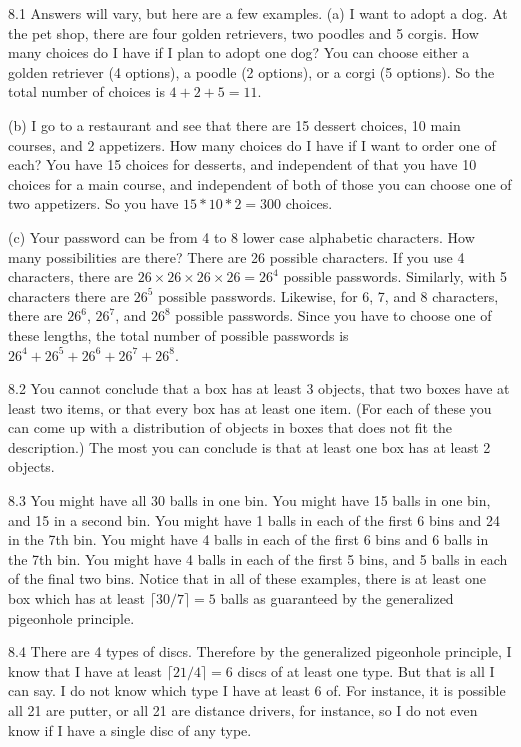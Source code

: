 \begin{RequAnswer}{8.1}
Answers will vary, but here are a few examples.
(a) I want to adopt a dog. At the pet shop, there are four golden retrievers, two poodles and 5 corgis.
How many choices do I have if I plan to adopt one dog?
You can choose either a golden retriever (4 options), a poodle (2 options), or a corgi (5 options).
So the total number of choices is $4 + 2 + 5 = 11$.

(b) I go to a restaurant and see that there are 15 dessert choices,
10 main courses, and 2 appetizers. How many choices do I have if I want to order one of each?
You have 15 choices for desserts, and independent of that you have 10 choices for a main course,
and independent of both of those you can choose one of two appetizers.
So you have $15 * 10 * 2 = 300$ choices.

(c) Your password can be from 4 to 8 lower case alphabetic characters. How many possibilities are there?
There are 26 possible characters. If you use 4 characters, there are
$26\times 26\times 26\times 26 = 26^4$ possible passwords.
Similarly, with 5 characters there are $26^5$ possible passwords.
Likewise, for 6, 7, and 8 characters, there are $26^6$, $26^7$, and $26^8$ possible passwords.
Since you have to choose one of these lengths, the total number of possible passwords is
$26^4+26^5+26^6+26^7+26^8$.
\end{RequAnswer}
\begin{RequAnswer}{8.2}
You cannot conclude that a box has at least 3 objects, that two boxes have at least two items,
or that every box has at least one item.
(For each of these you can come up with a distribution of objects in boxes that does not fit the description.)
The most you can conclude is that at least one box has at least 2 objects.
\end{RequAnswer}
\begin{RequAnswer}{8.3}
You might have all 30 balls in one bin.
You might have 15 balls in one bin, and 15 in a second bin.
You might have 1 balls in each of the first 6 bins and 24 in the 7th bin.
You might have 4 balls in each of the first 6 bins and 6 balls in the 7th bin.
You might have 4 balls in each of the first 5 bins, and 5 balls in each of the final two bins.
Notice that in all of these examples, there is at least one box which has at least $\lceil 30/7\rceil =  5$ balls
as guaranteed by the generalized pigeonhole principle.
\end{RequAnswer}
\begin{RequAnswer}{8.4}
There are 4 types of discs. Therefore by the generalized pigeonhole principle, I know that I have
at least $\lceil 21/4\rceil =  6$ discs of at least one type. But that is all I can say.
I do not know which type I have at least 6 of. For instance, it is possible all 21 are putter, or
all 21 are distance drivers, for instance, so I do not even know if I have a single disc of any type.
\end{RequAnswer}
